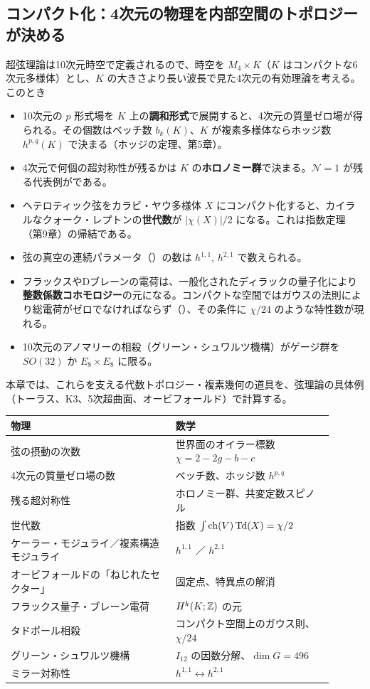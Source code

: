 \subsection*{コンパクト化：4次元の物理を内部空間のトポロジーが決める}
超弦理論は10次元時空で定義されるので、時空を $M_4\times K$（$K$ はコンパクトな6次元多様体）とし、$K$ の大きさより長い波長で見た4次元の有効理論を考える。このとき
\begin{itemize}
\item 10次元の $p$ 形式場を $K$ 上の\textbf{調和形式}で展開すると、4次元の質量ゼロ場が得られる。その個数はベッチ数 $b_k(K)$、$K$ が複素多様体ならホッジ数 $h^{p,q}(K)$ で決まる（ホッジの定理、第5章）。
\item 4次元で何個の超対称性が残るかは $K$ の\textbf{ホロノミー群}で決まる。$\mathcal N=1$ が残る代表例がである。
\item ヘテロティック弦をカラビ・ヤウ多様体 $X$ にコンパクト化すると、カイラルなクォーク・レプトンの\textbf{世代数}が $\lvert\chi(X)\rvert/2$ になる。これは指数定理（第9章）の帰結である。
\item 弦の真空の連続パラメータ（）の数は $h^{1,1}$, $h^{2,1}$ で数えられる。
\item フラックスやDブレーンの電荷は、一般化されたディラックの量子化により\textbf{整数係数コホモロジー}の元になる。コンパクトな空間ではガウスの法則により総電荷がゼロでなければならず（）、その条件に $\chi/24$ のような特性数が現れる。
\item 10次元のアノマリーの相殺（グリーン・シュワルツ機構）がゲージ群を $SO(32)$ か $E_8\times E_8$ に限る。
\end{itemize}
本章では、これらを支える代数トポロジー・複素幾何の道具を、弦理論の具体例（トーラス、K3、5次超曲面、オービフォールド）で計算する。

\begin{physbox}[：本章の辞書]
\begin{center}
\small
\begin{tabular}{p{0.46\linewidth}p{0.44\linewidth}}
物理 & 数学\\ \hline
弦の摂動の次数 & 世界面のオイラー標数 $\chi=2-2g-b-c$\\
4次元の質量ゼロ場の数 & ベッチ数、ホッジ数 $h^{p,q}$\\
残る超対称性 & ホロノミー群、共変定数スピノル\\
世代数 & 指数 $\int\operatorname{ch}(V)\operatorname{Td}(X)=\chi/2$\\
ケーラー・モジュライ／複素構造モジュライ & $h^{1,1}$ ／ $h^{2,1}$\\
オービフォールドの「ねじれたセクター」 & 固定点、特異点の解消\\
フラックス量子・ブレーン電荷 & $H^{k}(K;\mathbb{Z})$ の元\\
タドポール相殺 & コンパクト空間上のガウス則、$\chi/24$\\
グリーン・シュワルツ機構 & $I_{12}$ の因数分解、$\dim G=496$\\
ミラー対称性 & $h^{1,1}\leftrightarrow h^{2,1}$
\end{tabular}
\end{center}
\end{physbox}

